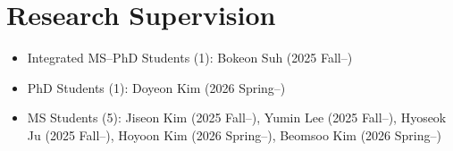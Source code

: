\section{Research Supervision}

\begin{itemize}[label=$\cdot$]
  \item Integrated MS–PhD Students (1): Bokeon Suh (2025 Fall--)
  \vspace{-1mm}
  \item PhD Students (1): Doyeon Kim (2026 Spring--)
  \vspace{-1mm}
  \item MS Students (5): Jiseon Kim (2025 Fall--), Yumin Lee (2025 Fall--), Hyoseok Ju (2025 Fall--), Hoyoon Kim (2026 Spring--), Beomsoo Kim (2026 Spring--)
\end{itemize}
